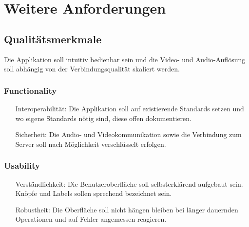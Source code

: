 \section{Weitere Anforderungen}

\subsection{Qualitätsmerkmale}
Die Applikation soll intuitiv bedienbar sein und die Video- und Audio-Auflösung
soll abhängig von der Verbindungsqualität skaliert werden.


\subsubsection{Functionality}
\begin{itemize}
	\item[Interoperabilität:] Die Applikation soll auf existierende Standards setzen und wo eigene Standards nötig sind, diese offen dokumentieren.
	\item[Sicherheit:] Die Audio- und Videokommunikation sowie die Verbindung zum Server soll nach Möglichkeit verschlüsselt erfolgen.
\end{itemize}


\subsubsection{Usability}
\begin{itemize}
	\item[Verständlichkeit:] Die Benutzeroberfläche soll selbsterklärend aufgebaut sein. Knöpfe und Labels sollen sprechend bezeichnet sein.
	\item[Robustheit:] Die Oberfläche soll nicht hängen bleiben bei länger dauernden Operationen und auf Fehler angemessen reagieren.
\end{itemize}


